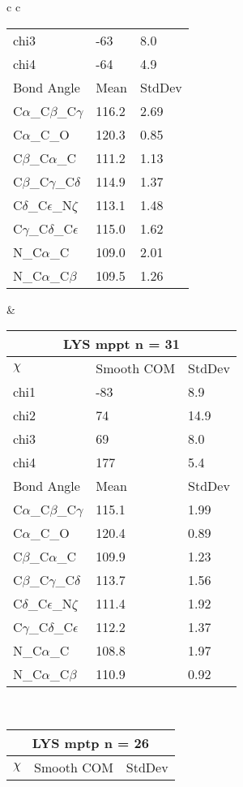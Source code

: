 \begin{longtable}{ c c }
\begin{tabular}{ l l l }
  chi3 & -63 & 8.0 \\ 
  chi4 & -64 & 4.9 \\ \midrule
  Bond Angle   & Mean     & StdDev \\ \midrule
  C$\alpha$\_C$\beta$\_C$\gamma$ & 116.2 & 2.69\\
  C$\alpha$\_C\_O & 120.3 & 0.85\\
  C$\beta$\_C$\alpha$\_C & 111.2 & 1.13\\
  C$\beta$\_C$\gamma$\_C$\delta$ & 114.9 & 1.37\\
  C$\delta$\_C$\epsilon$\_N$\zeta$ & 113.1 & 1.48\\
  C$\gamma$\_C$\delta$\_C$\epsilon$ & 115.0 & 1.62\\
  N\_C$\alpha$\_C & 109.0 & 2.01\\
  N\_C$\alpha$\_C$\beta$ & 109.5 & 1.26\\
  \bottomrule
  \end{tabular}
  &
  \begin{tabular}{ l l l }
  \toprule
  \multicolumn{3}{c}{LYS \textbf{mppt} n = 31} \\ \toprule
  $\chi$       & Smooth COM & StdDev \\ \midrule
  chi1 & -83 & 8.9 \\ 
  chi2 & 74 & 14.9 \\ 
  chi3 & 69 & 8.0 \\ 
  chi4 & 177 & 5.4 \\ \midrule
  Bond Angle   & Mean     & StdDev \\ \midrule
  C$\alpha$\_C$\beta$\_C$\gamma$ & 115.1 & 1.99\\
  C$\alpha$\_C\_O & 120.4 & 0.89\\
  C$\beta$\_C$\alpha$\_C & 109.9 & 1.23\\
  C$\beta$\_C$\gamma$\_C$\delta$ & 113.7 & 1.56\\
  C$\delta$\_C$\epsilon$\_N$\zeta$ & 111.4 & 1.92\\
  C$\gamma$\_C$\delta$\_C$\epsilon$ & 112.2 & 1.37\\
  N\_C$\alpha$\_C & 108.8 & 1.97\\
  N\_C$\alpha$\_C$\beta$ & 110.9 & 0.92\\
  \bottomrule
  \end{tabular}
  \\
  \begin{tabular}{ l l l }
  \toprule
  \multicolumn{3}{c}{LYS \textbf{mptp} n = 26} \\ \toprule
  $\chi$       & Smooth COM & StdDev \\ \midrule

\end{tabular}
\end{longtable}
